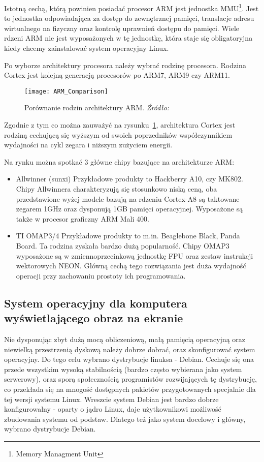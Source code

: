 \par
Istotną cechą, którą powinien posiadać procesor ARM jest jednostka MMU\footnote{Memory Managment Unit}. Jest to jednostka odpowiadająca za dostęp do zewnętrznej pamięci, translacje adresu wirtualnego na fizyczny oraz kontrolę uprawnień dostępu do pamięci. Wiele rdzeni ARM nie jest wyposażonych w tę jednostkę, która staje się obligatoryjna kiedy chcemy zainstalować system operacyjny Linux. 
\par

Po wyborze architektury procesora należy wybrać rodzinę procesora. Rodzina Cortex jest kolejną generacją procesorów po ARM7, ARM9 czy ARM11.

\begin{figure}
\begin{center}
	\texttt{[image: ARM\_Comparison]}
\end{center}
\caption{Porównanie rodzin architektury ARM. \emph{Źródło: \cite{arm-mmu}}}
\label{fig:ARM_Comp}
\end{figure}

Zgodnie z tym co można zauważyć na rysunku~\ref{fig:ARM_Comp}, architektura Cortex jest rodziną cechującą się wyższym od swoich poprzedników współczynnikiem wydajności na cykl zegara i niższym zużyciem energii.

Na rynku można spotkać 3 główne chipy bazujące na architekturze ARM:
\begin{itemize}
	\item Allwinner (sunxi)
	Przykładowe produkty to Hackberry A10, czy MK802. Chipy Allwinnera charakteryzują się stosunkowo niską ceną, oba przedstawione wyżej modele bazują na rdzeniu Cortex-A8 są taktowane zegarem 1GHz oraz dysponują 1GB pamięci operacyjnej. Wyposażone są także w procesor graficzny ARM Mali 400.
	\item TI OMAP3/4
	Przykładowe produkty to m.in. Beaglebone Black, Panda Board. Ta rodzina zyskała bardzo dużą popularność. Chipy OMAP3 wyposażone są w zmiennoprzecinkową jednostkę FPU oraz zestaw instrukcji wektorowych NEON. Główną cechą tego rozwiązania jest duża wydajność operacji przy zachowaniu prostoty ich programowania.
\end{itemize}

\subsection{System operacyjny dla komputera wyświetlającego obraz na ekranie}

Nie dysponując zbyt dużą mocą obliczeniową, małą pamięcią operacyjną oraz niewielką przestrzenią dyskową należy dobrze dobrać, oraz skonfigurować system operacyjny. Do tego celu wybrano dystrybucje linuksa - Debian. Cechuje się ona przede wszystkim wysoką stabilnością (bardzo często wybierana jako system serwerowy), oraz sporą społecznością programistów rozwijających tę dystrybucję, co przekłada się na mnogość dostępnych pakietów przygotowanych specjalnie dla tej wersji systemu Linux. Wreszcie system Debian jest bardzo dobrze konfigurowalny - oparty o jądro Linux, daje użytkownikowi możliwość zbudowania systemu od podstaw. Dlatego też jako system docelowy i główny, wybrano dystrybucje Debian.

